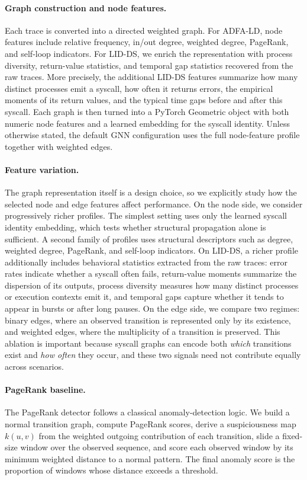 \documentclass{article}
\begin{document}
\paragraph{Graph construction and node features.}
Each trace is converted into a directed weighted graph. For ADFA-LD, node features include relative frequency, in/out degree, weighted degree, PageRank, and self-loop indicators. For LID-DS, we enrich the representation with process diversity, return-value statistics, and temporal gap statistics recovered from the raw traces. More precisely, the additional LID-DS features summarize how many distinct processes emit a syscall, how often it returns errors, the empirical moments of its return values, and the typical time gaps before and after this syscall. Each graph is then turned into a PyTorch Geometric object with both numeric node features and a learned embedding for the syscall identity. Unless otherwise stated, the default GNN configuration uses the full node-feature profile together with weighted edges.

\paragraph{Feature variation.}
The graph representation itself is a design choice, so we explicitly study how the selected node and edge features affect performance. On the node side, we consider progressively richer profiles. The simplest setting uses only the learned syscall identity embedding, which tests whether structural propagation alone is sufficient. A second family of profiles uses structural descriptors such as degree, weighted degree, PageRank, and self-loop indicators. On LID-DS, a richer profile additionally includes behavioral statistics extracted from the raw traces: error rates indicate whether a syscall often fails, return-value moments summarize the dispersion of its outputs, process diversity measures how many distinct processes or execution contexts emit it, and temporal gaps capture whether it tends to appear in bursts or after long pauses. On the edge side, we compare two regimes: binary edges, where an observed transition is represented only by its existence, and weighted edges, where the multiplicity of a transition is preserved. This ablation is important because syscall graphs can encode both \emph{which} transitions exist and \emph{how often} they occur, and these two signals need not contribute equally across scenarios.

\paragraph{PageRank baseline.}
The PageRank detector follows a classical anomaly-detection logic. We build a normal transition graph, compute PageRank scores, derive a suspiciousness map $k(u,v)$ from the weighted outgoing contribution of each transition, slide a fixed-size window over the observed sequence, and score each observed window by its minimum weighted distance to a normal pattern. The final anomaly score is the proportion of windows whose distance exceeds a threshold.
\end{document}
